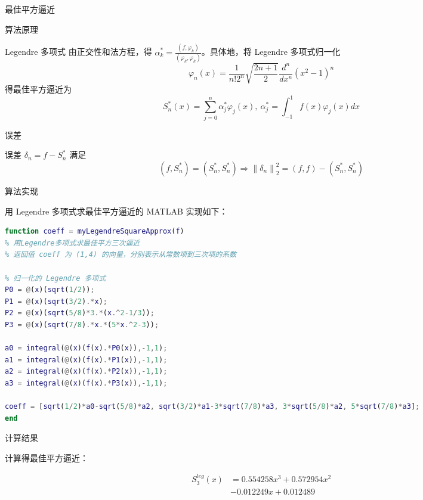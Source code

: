 \documentclass[a4paper]{article}
\begin{document}
\begin{multicols}{2}
\begin{section}{最佳平方逼近}
\begin{subsection}{算法原理}
\begin{subsubsection}{Legendre 多项式}
			由正交性和法方程，得 $ \alpha_{k}^{*}=\frac{\left(f, \varphi_{k}\right)}{\left(\varphi_{k}, \varphi_{k}\right)} $。具体地，将 Legendre 多项式归一化 $$\varphi_{n}(x)=\frac{1}{n ! 2^{n}} \sqrt{\frac{2 n+1}{2}} \frac{d^{n}}{d x^{n}}\left(x^{2}-1\right)^{n} $$ 得最佳平方逼近为 $$S_{n}^{*}(x)=\sum_{j=0}^{n} \alpha_{j}^{*} \varphi_{j}(x), \  \alpha_{j}^{*}=\int_{-1}^{1} f(x) \varphi_{j}(x) d x $$
			
		\end{subsubsection}
		
		\begin{subsubsection}{误差}
			
			误差 $\delta_{n}=f-S_{n}^{*}$ 满足 $$\left(f, S_{n}^{*}\right)=\left(S_{n}^{*}, S_{n}^{*}\right) \Longrightarrow\left\|\delta_{n}\right\|_{2}^{2}=(f, f)-\left(S_{n}^{*}, S_{n}^{*}\right)$$
			
		\end{subsubsection}
		
	\end{subsection}
	
	\begin{subsection}{算法实现}
	
		用 Legendre 多项式求最佳平方逼近的 MATLAB 实现如下：
		
\begin{lstlisting}[language=Matlab]
function coeff = myLegendreSquareApprox(f)
% 用Legendre多项式求最佳平方三次逼近
% 返回值 coeff 为 (1,4) 的向量，分别表示从常数项到三次项的系数

% 归一化的 Legendre 多项式
P0 = @(x)(sqrt(1/2));
P1 = @(x)(sqrt(3/2).*x);
P2 = @(x)(sqrt(5/8)*3.*(x.^2-1/3));
P3 = @(x)(sqrt(7/8).*x.*(5*x.^2-3));

a0 = integral(@(x)(f(x).*P0(x)),-1,1);
a1 = integral(@(x)(f(x).*P1(x)),-1,1);
a2 = integral(@(x)(f(x).*P2(x)),-1,1);
a3 = integral(@(x)(f(x).*P3(x)),-1,1);

coeff = [sqrt(1/2)*a0-sqrt(5/8)*a2, sqrt(3/2)*a1-3*sqrt(7/8)*a3, 3*sqrt(5/8)*a2, 5*sqrt(7/8)*a3];
end


\end{lstlisting}
		
	\end{subsection}
	
	\begin{subsection}{计算结果}
		
		计算得最佳平方逼近：
		
		\begin{equation} \nonumber
			\begin{aligned} S_3^{leg}(x)&=0.554258x^3+0.572954x^2\\ &-0.012249x+0.012489 \end{aligned}	
		\end{equation}
		

\end{subsection}
\end{section}
\end{multicols}
\end{document}
